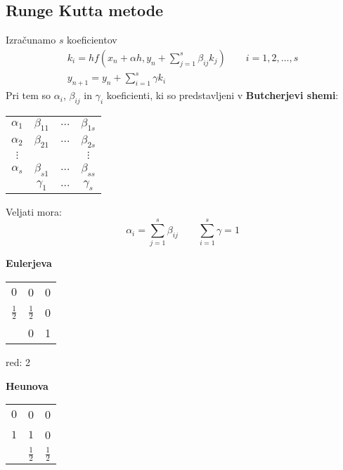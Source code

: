 \begin{multicols}{5}
\subsection*{Runge Kutta metode}
Izračunamo $s$ koeficientov
\begin{gather*}
    k_i = hf(x_n + \alpha h, y_n + \sum_{j=1}^s \beta_{ij} k_j) \qquad i = 1, 2, \dots, s \\
    y_{n+1} = y_n + \sum_{i=1}^s \gamma k_i
\end{gather*}
Pri tem so $\alpha_i$, $\beta_{ij}$ in $\gamma_i$ koeficienti, ki so predstavljeni v \textbf{Butcherjevi shemi}:
\begin{center}
    \begin{tabular}[]{c | c c c}
        $\alpha_1$ & $\beta_{11}$ & $\dots$ & $\beta_{1s}$ \\
        $\alpha_2$ & $\beta_{21}$ & $\dots$ & $\beta_{2s}$ \\
        $\vdots$ &                &         & $\vdots$ \\
        $\alpha_s$ & $\beta_{s1}$ & $\dots$ & $\beta_{ss}$ \\ \hline
                 & $\gamma_{1}$ & $\dots$ & $\gamma_{s}$ \\

    \end{tabular}
\end{center}
Veljati mora:
\[\alpha_i = \sum_{j=1}^{s} \beta_{ij} \qquad \sum_{i=1}^s \gamma = 1\]

\begin{multicols*}{3}
    
    \textbf{Eulerjeva}
    \begin{center}
        \renewcommand{\arraystretch}{1.5}
        \begin{tabular}[]{c | c c}
            $0$ & 0 & 0 \\
            $\frac{1}{2}$ & $\frac{1}{2}$ & 0 \\ \hline
            & 0 & 1 \\
            
        \end{tabular}
    \end{center}
    red: 2

    \textbf{Heunova}
    \begin{center}
        \renewcommand{\arraystretch}{1.5}
        \begin{tabular}[]{c | c c}
            $0$ & 0 & 0 \\
            $1$ & $1$ & 0 \\ \hline
            & $\frac{1}{2}$ & $\frac{1}{2}$ \\
            

\end{tabular}
\end{center}
\end{multicols*}
\end{multicols}
